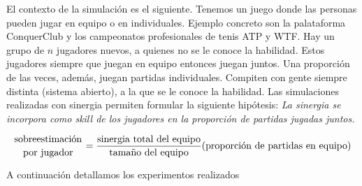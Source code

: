 \documentclass[a4paper,11pt]{book}
\newcommand\hfrac[2]{\genfrac{}{}{0pt}{}{#1}{#2}} %
\theoremstyle{definition}
\begin{document}
El contexto de la simulaci\'on es el siguiente.
Tenemos un juego donde las personas pueden jugar en equipo o en individuales.
Ejemplo concreto son la palataforma ConquerClub y los campeonatos profesionales de tenis ATP y WTF.
Hay un grupo de $n$ jugadores nuevos, a quienes no se le conoce la habilidad.
Estos jugadores siempre que juegan en equipo entonces juegan juntos.
Una proporci\'on de las veces, adem\'as, juegan partidas individuales.
Compiten con gente siempre distinta (sistema abierto), a la que se le conoce la habilidad.
Las simulaciones realizadas con sinergia permiten formular la siguiente hip\'otesis: \emph{La sinergia se incorpora como skill de los jugadores en la proporción de partidas jugadas juntos.}

\begin{equation}\label{eq:sobreestimacion}
   \hfrac{\text{sobreestimaci\'on}}{\text{por jugador}} = \frac{\text{sinergia total del equipo}}{\text{tama\~no del equipo}}(\text{proporci\'on de partidas en equipo}) 
\end{equation}

A continuaci\'on detallamos los experimentos realizados
\end{document}
